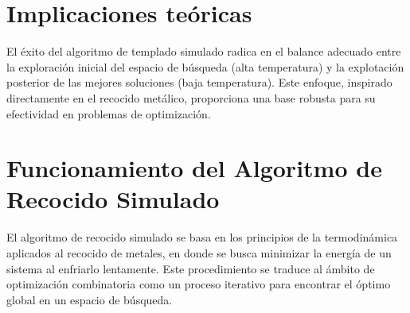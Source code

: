\documentclass{article}
\begin{document}
\section{Implicaciones teóricas}

El éxito del algoritmo de templado simulado radica en el balance adecuado entre la exploración inicial del espacio de búsqueda (alta temperatura) y la explotación posterior de las mejores soluciones (baja temperatura). Este enfoque, inspirado directamente en el recocido metálico, proporciona una base robusta para su efectividad en problemas de optimización.

\section{Funcionamiento del Algoritmo de Recocido Simulado}

El algoritmo de recocido simulado se basa en los principios de la termodinámica aplicados al recocido de metales, en donde se busca minimizar la energía de un sistema al enfriarlo lentamente. Este procedimiento se traduce al ámbito de optimización combinatoria como un proceso iterativo para encontrar el óptimo global en un espacio de búsqueda.
\end{document}
